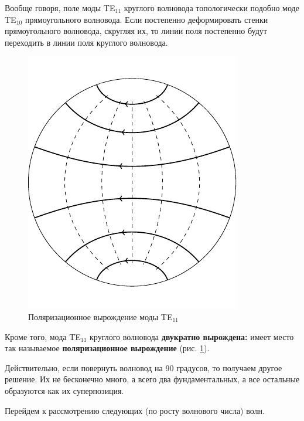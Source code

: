 Вообще говоря, поле моды TE$_{11}$ круглого волновода топологически подобно моде TE$_{10}$ прямоугольного волновода. Если постепенно деформировать стенки прямоугольного волновода, скругляя их, то линии поля постепенно будут переходить в линии поля круглого волновода.
\begin{figure}[H]
	\centering
	\includegraphics[scale=1.4]{img_lect5/cylindric/TE11_rotated}
	\caption{Поляризационное вырождение моды TE$_{11}$}
	\label{fig:cylinder:TE11_rotated}
\end{figure}
Кроме того, мода TE$_{11}$ круглого волновода \textbf{двукратно вырождена:} имеет место так называемое \textbf{поляризационное вырождение} (рис. \ref{fig:cylinder:TE11_rotated}).

Действительно, если повернуть волновод на 90 градусов, то получаем другое решение. Их не бесконечно много, а всего два фундаментальных, а все остальные образуются как их суперпозиция. 


Перейдем к рассмотрению следующих (по росту волнового числа) волн.
\newpage
